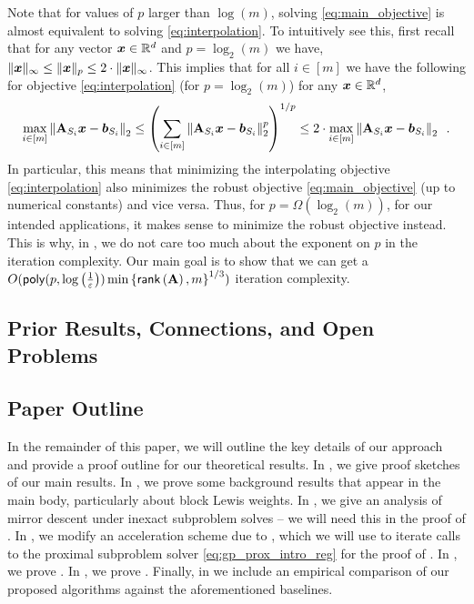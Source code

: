 \begin{remark} 
    Note that for values of $p$ larger than $\log(m)$, solving \eqref{eq:main_objective} is almost equivalent to solving \eqref{eq:interpolation}. To intuitively see this, first recall that for any vector $\bm{x}\in\mathbb{R}^d$ and $p=\log_2(m)$ we have, $\|\bm{x}\|_\infty \leq \|\bm{x}\|_{p} \leq 2\cdot\|\bm{x}\|_\infty$. This implies that for all $i\in[m]$ we have the following for objective \eqref{eq:interpolation} (for $p=\log_2(m)$) for any $\bm{x}\in\mathbb{R}^d$,
    \begin{align*}
        \max_{i\in[m]}\left\lVert \mathbf{A}_{S_i}\bm{x}-\bm{b}_{S_i} \right\rVert_2 \leq \left(\sum_{i\in[m]}\left\lVert \mathbf{A}_{S_i}\bm{x}-\bm{b}_{S_i} \right\rVert_2^{p}\right)^{1/p}\leq 2\cdot\max_{i\in[m]}\left\lVert \mathbf{A}_{S_i}\bm{x}-\bm{b}_{S_i} \right\rVert_2\enspace. 
    \end{align*}
    In particular, this means that minimizing the interpolating objective \eqref{eq:interpolation} also minimizes the robust objective \eqref{eq:main_objective} (up to numerical constants) and vice versa. Thus, for $p=\Omega\left(\log_2(m)\right)$, for our intended applications, it makes sense to minimize the robust objective instead. This is why, in , we do not care too much about the exponent on $p$ in the iteration complexity. Our main goal is to show that we can get a $O(\mathsf{poly}(p,\log\left(\frac{1}{\varepsilon}\right))\min\left\{\mathsf{rank}\left(\mathbf{A}\right),m\right\}^{1/3})$ iteration complexity.
\end{remark}

\subsection{Prior Results, Connections, and Open Problems}


\subsection{Paper Outline}

In the remainder of this paper, we will outline the key details of our approach and provide a proof outline for our theoretical results. In , we give proof sketches of our main results. In , we prove some background results that appear in the main body, particularly about block Lewis weights. In , we give an analysis of mirror descent under inexact subproblem solves -- we will need this in the proof of . In , we modify an acceleration scheme due to \cite{chjjs22}, which we will use to iterate calls to the proximal subproblem solver \eqref{eq:gp_prox_intro_reg} for the proof of . In , we prove . In , we prove . Finally, in  we include an empirical comparison of our proposed algorithms against the aforementioned baselines.